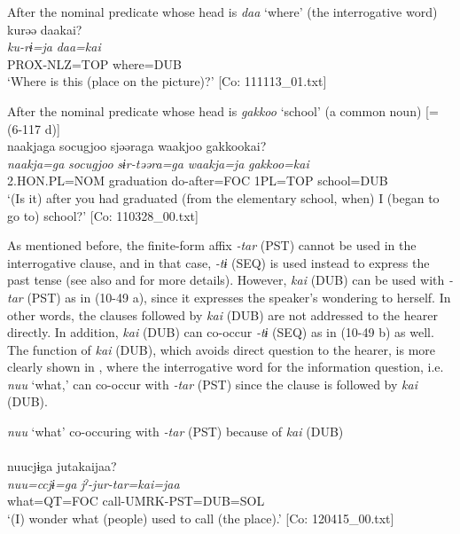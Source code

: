 \begin{xlist}
  \ex After the nominal predicate whose head is \textit{daa} ‘where’ (the interrogative word)\\
      \glll    kurəə  daakai?\\
    \textit{ku-rɨ=ja}  \textit{daa=kai}\\
    PROX-NLZ=TOP  where=DUB\\
\glt     ‘Where is this (place on the picture)?’  [Co: 111113\_01.txt]

  \ex After the nominal predicate whose head is \textit{gakkoo} ‘school’ (a common noun) [= (6-117 d)]\\
      \glll    naakjaga  {\textbar}socugjoo{\textbar}  sjəəraga  waakjoo  {\textbar}gakkoo{\textbar}kai?\\
    \textit{naakja=ga}  \textit{socugjoo}  \textit{sɨr-təəra=ga}  \textit{waakja=ja}  \textit{gakkoo=kai}\\
    2.HON.PL=NOM  graduation  do-after=FOC  1PL=TOP  school=DUB\\
    \glt     ‘(Is it) after you had graduated (from the elementary school, when) I (began to go to) school?’  [Co: 110328\_00.txt]
    \z
\z

As mentioned before, the finite-form affix \textit{{}-tar} (PST) cannot be used in the interrogative clause, and in that case, \textit{{}-tɨ} (SEQ) is used instead to express the past tense (see also  and  for more details). However, \textit{kai} (DUB) can be used with \textit{{}-tar} (PST) as in (10-49 a), since it expresses the speaker’s wondering to herself. In other words, the clauses followed by \textit{kai} (DUB) are not addressed to the hearer directly. In addition, \textit{kai} (DUB) can co-occur \textit{{}-tɨ} (SEQ) as in (10-49 b) as well. The function of \textit{kai} (DUB), which avoids direct question to the hearer, is more clearly shown in , where the interrogative word for the information question, i.e. \textit{nuu} ‘what,’ can co-occur with \textit{{}-tar} (PST) since the clause is followed by \textit{kai} (DUB).

\ea\label{ex:10.50}   \textit{nuu} ‘what’ co-occuring with \textit{{}-tar} (PST) because of \textit{kai} (DUB) \\\\
      \glll    nuucjɨga  jutakaijaa?\\
    \textit{nuu=ccjɨ=ga}  \textit{jˀ-jur-tar=kai=jaa}\\
    what=QT=FOC  call-UMRK-PST=DUB=SOL\\
\glt     ‘(I) wonder what (people) used to call (the place).’  [Co: 120415\_00.txt]
\z


\end{xlist}
